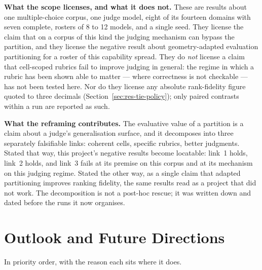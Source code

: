 \textbf{What the scope licenses, and what it does not.}
These are results about one multiple-choice corpus, one judge model,
eight of its fourteen domains with seven complete, rosters of 8 to 12
models, and a single seed. They
license the claim that on a corpus of this kind the judging mechanism
can bypass the partition, and they license the negative result about
geometry-adapted evaluation partitioning for a roster of this
capability spread. They do \emph{not} license a claim that cell-scoped
rubrics fail to improve judging in general: the regime in which a
rubric has been shown able to matter --- where correctness is not
checkable --- has not been tested here. Nor do they license any
absolute rank-fidelity figure quoted to three decimals
(Section~\ref{sec:res-tie-policy}); only paired contrasts within a run
are reported as such.

\textbf{What the reframing contributes.}
The evaluative value of a partition is a claim about a judge's
generalisation surface, and it decomposes into three separately
falsifiable links: coherent cells, specific rubrics, better judgments.
Stated that way, this project's negative results become locatable:
link~1 holds, link~2 holds, and link~3 fails at its premise on this
corpus and at its mechanism on this judging regime. Stated the other
way, as a single claim that adapted partitioning improves ranking
fidelity, the same results read as a project that did not work. The
decomposition is not a post-hoc rescue; it was written down and dated
before the runs it now organises.

\section{Outlook and Future Directions}\label{sec:disc-future}

In priority order, with the reason each sits where it does.

